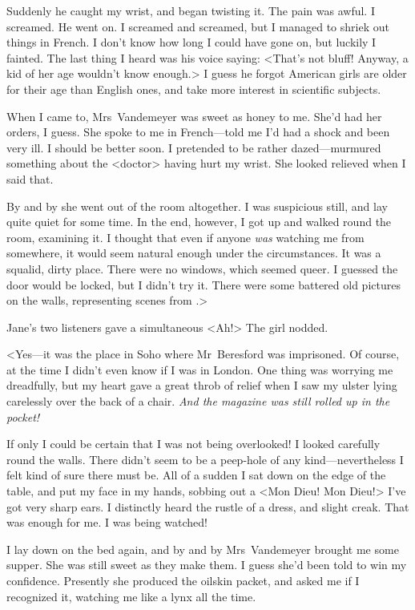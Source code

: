 Suddenly he caught my wrist, and began twisting it. The pain was awful. I screamed. He went on. I screamed and screamed, but I managed to shriek out things in French. I don't know how long I could have gone on, but luckily I fainted. The last thing I heard was his voice saying: <That's not bluff! Anyway, a kid of her age wouldn't know enough.> I guess he forgot American girls are older for their age than English ones, and take more interest in scientific subjects.

When I came to, Mrs~Vandemeyer was sweet as honey to me. She'd had her orders, I guess. She spoke to me in French—told me I'd had a shock and been very ill. I should be better soon. I pretended to be rather dazed—murmured something about the <doctor> having hurt my wrist. She looked relieved when I said that.

By and by she went out of the room altogether. I was suspicious still, and lay quite quiet for some time. In the end, however, I got up and walked round the room, examining it. I thought that even if anyone \emph{was} watching me from somewhere, it would seem natural enough under the circumstances. It was a squalid, dirty place. There were no windows, which seemed queer. I guessed the door would be locked, but I didn't try it. There were some battered old pictures on the walls, representing scenes from .>

Jane's two listeners gave a simultaneous <Ah!> The girl nodded.

<Yes—it was the place in Soho where Mr~Beresford was imprisoned. Of course, at the time I didn't even know if I was in London. One thing was worrying me dreadfully, but my heart gave a great throb of relief when I saw my ulster lying carelessly over the back of a chair. \emph{And the magazine was still rolled up in the pocket!}

If only I could be certain that I was not being overlooked! I looked carefully round the walls. There didn't seem to be a peep-hole of any kind—nevertheless I felt kind of sure there must be. All of a sudden I sat down on the edge of the table, and put my face in my hands, sobbing out a <Mon Dieu! Mon Dieu!> I've got very sharp ears. I distinctly heard the rustle of a dress, and slight creak. That was enough for me. I was being watched!

I lay down on the bed again, and by and by Mrs~Vandemeyer brought me some supper. She was still sweet as they make them. I guess she'd been told to win my confidence. Presently she produced the oilskin packet, and asked me if I recognized it, watching me like a lynx all the time.

